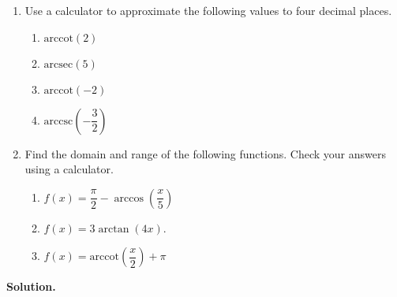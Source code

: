 \begin{ex} \label{arcstuffoncalc} $~$

\begin{enumerate}

\item Use a calculator to approximate the following values to four decimal places.

\begin{multicols}{4}

\begin{enumerate}

\item  $\mbox{arccot}(2)$ 

\item  $\mbox{arcsec}(5)$ 

\item \label{arccotneg2} $\mbox{arccot}(-2)$ 

\item  $\mbox{arccsc}\left(-\dfrac{3}{2}\right)$

\end{enumerate}

\end{multicols}

\item  Find the domain and range of the following functions. Check your answers using a calculator.

\begin{multicols}{3}

\begin{enumerate}

\item  $f(x) = \dfrac{\pi}{2} - \arccos\left(\dfrac{x}{5}\right)$

\item  $f(x) = 3\arctan\left(4x \right)$. 

\item  \label{arccotangentcalc} $f(x) = \text{arccot}\left(\dfrac{x}{2} \right) + \pi$

\end{enumerate}

\end{multicols}

\end{enumerate}


{\bf Solution.}

\begin{enumerate}


\end{enumerate}
\end{ex}
